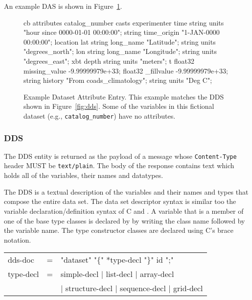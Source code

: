 \documentclass{article}
\begin{document}
An example \ac{DAS} is shown in Figure~\ref{fig:das}.

\begin{figure}
\begin{vcode}{cb}
attributes {
   catalog_number {
   }
   casts {
      experimenter {
      }
      time {
         string units "hour since 0000-01-01 00:00:00";
         string time_origin "1-JAN-0000 00:00:00";
      }
      location {
         lat {
            string long_name "Latitude";
            string units "degrees_north";
         }
         lon {
            string long_name "Longitude";
            string units "degrees_east";
         }
      }
      xbt {
         depth {
            string units "meters";
         }
         t {
            float32 missing_value -9.99999979e+33;
            float32 _fillvalue -9.99999979e+33;
            string history "From coads_climatology";
            string units "Deg C";
         }
      }
   }
}
\end{vcode}
\caption{Example Dataset Attribute Entry. This example matches the DDS shown
   in Figure~\ref{fig:dds}. Some of the variables in this fictional dataset
   (e.g., \texttt{catalog\_number}) have no attributes. }
\label{fig:das}
\end{figure}

\subsubsection{DDS}
\label{sec:dds}
The \ac{DDS} entity is returned as the payload of a message whose
\texttt{Content-Type} header MUST be \texttt{text/plain}. The body of the
response contains text which holds all of the variables, their names and
datatypes.

The DDS is a textual description of the variables and their names and types
that compose the entire data set. The data set descriptor syntax is similar
too the variable declaration/definition syntax of {\small C} and \Cpp. A
variable that is a member of one of the base type classes is declared by by
writing the class name followed by the variable name. The type constructor
classes are declared using {\small C}'s brace notation.

\begin{ttfamily}
\begin{center}
\begin{tabular}{lll}
dds-doc & = & "dataset" "\{" *type-decl "\}" id ";" \\
type-decl & = & simple-decl | list-decl | array-decl \\
          & & | structure-decl | sequence-decl | grid-decl \\
\end{tabular}
\end{center}
\end{ttfamily}
\end{document}
